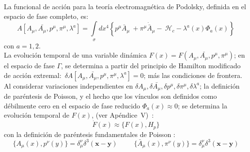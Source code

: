 \documentclass[a4paper,12pt]{article}
\begin{document}
La funcional de acción para la teoría electromagnética de Podolsky, definida en el espacio de fase completo, es:    
\begin{equation}
A[A_\mu,\bar{A_\mu},p^\mu,\pi^\mu,\lambda^a]=\int\limits_{\sigma}dx^4\left\{p^{\mu}\bar{A}_\mu\ +\pi^{\mu}\dot{\bar{ A}}_\mu -\ \mathscr{H}_c-\lambda^a(x)\Phi_a(x) \right\} 
\end{equation}
con $a=1,2$.
\\

La evolución temporal de una variable dinámica $F(x)=F(A_\mu,\bar{A_\mu},p^\mu,\pi^\mu)$; en el espacio de fase $\Gamma$, se determina a partir del principio de Hamilton \mbox{modificado} de acción \mbox{extremal: $\delta A[A_\mu,\bar{A_\mu},p^\mu,\pi^\mu,\lambda^a]=0$;} más las condiciones de frontera.  Al considerar variaciones independientes en $\delta A_\mu,\delta \bar{A_\mu},\delta p^\mu,\delta \pi^\mu,\delta \lambda^a$; la definición de paréntesis de Poisson, y el hecho que los vínculos son definidos como débilmente cero en el espacio de fase
reducido \mbox{$\Phi_a(x)\approx0$;} se determina la evolución temporal de $F(x)$, (ver \mbox{Apéndice V) \cite{dirac,puebla,Merilin}}:
\begin{equation}
\dot{F}(x)\approx\{F(x),H_p\} 
\end{equation}
con la definición de paréntesis fundamentales de Poisson \cite{podolsky,forhaljdpo}:
\begin{equation}
\{A_\mu(x),p^{\nu}(y)\}=\delta_{\mu}^{\nu}\delta^3(\textbf{x}-\textbf{y})\ \ \ \ \ \ \ \ \ \ \ \{\bar A_\mu(x),\pi^{\nu}(y)\}=\delta_{\mu}^{\nu}\delta^3(\textbf{x}-\textbf{y})       
\end{equation}
\end{document}
